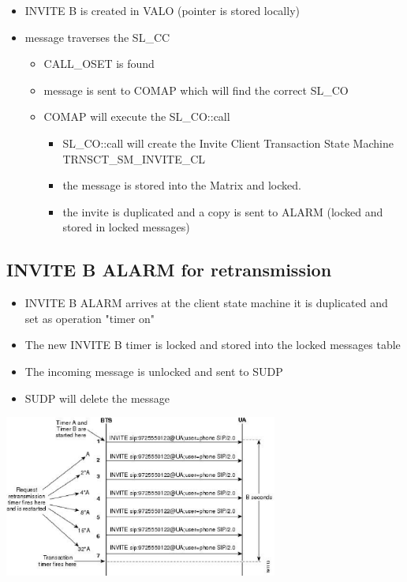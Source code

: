 \documentclass[a4paper]{report}
\begin{document}
\begin {itemize}
\item INVITE B is created in VALO (pointer is stored locally)
\item message traverses the SL\_CC
\begin {itemize}
\item CALL\_OSET is found
\item message is sent to COMAP which will find the correct SL\_CO
\item COMAP will execute the SL\_CO::call
\begin {itemize}
\item SL\_CO::call will create the Invite Client Transaction State Machine TRNSCT\_SM\_INVITE\_CL
\item the message is stored into the Matrix and locked.
\item the invite is duplicated and a copy is sent to ALARM (locked and stored in locked messages)
\end{itemize}
\end{itemize}
\end{itemize}

\subsection{INVITE B ALARM for retransmission}

\begin {itemize}
\item INVITE B ALARM arrives at the client state machine it is duplicated and set as operation "timer on"
\item The new INVITE B timer is locked and stored into the locked messages table
\item The incoming message is unlocked and sent to SUDP
\item SUDP will delete the message
\end{itemize}

\includegraphics[width=90mm]{timerAlogic.eps}
\end{document}
